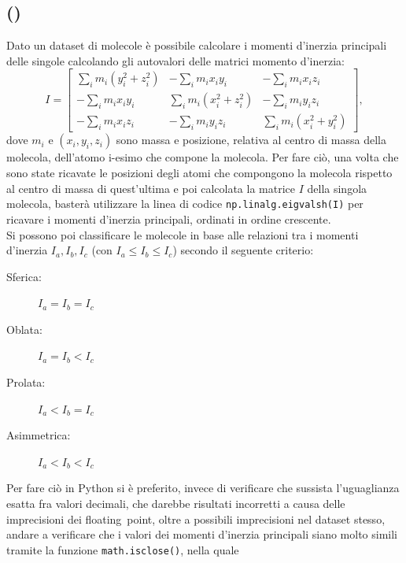 \documentclass[a4paper]{article}
\newcounter{count_es}
\newcounter{count_sub_es}[count_es]
\begin{document}
\subsection*{ ()}
Dato un dataset di molecole è possibile calcolare i momenti d'inerzia
principali delle singole calcolando gli autovalori delle matrici momento d'inerzia:
\[ I = \begin{bmatrix}
            \displaystyle\sum_{i}^{} m_{i}(y_{i}^{2} + z_{i}^{2}) & -\displaystyle\sum_{i}^{} m_{i} x_{i} y_{i}  & -\displaystyle\sum_{i}^{} m_{i} x_{i} z_{i}\\
            -\displaystyle\sum_{i}^{} m_{i} x_{i} y_{i} & \displaystyle\sum_{i}^{} m_{i}(x_{i}^{2} + z_{i}^{2}) & -\displaystyle\sum_{i}^{} m_{i} y_{i} z_{i}\\
            -\displaystyle\sum_{i}^{} m_{i} x_{i} z_{i} & -\displaystyle\sum_{i}^{} m_{i} y_{i} z_{i} & \displaystyle\sum_{i}^{} m_{i}(x_{i}^{2} + y_{i}^{2})
        \end{bmatrix}, \]
dove \(m_{i}\) e \((x_{i}, y_{i}, z_{i})\) sono massa e posizione, relativa al centro di massa 
della molecola, dell'atomo i-esimo che compone la molecola. Per fare ciò, una volta che sono state
ricavate le posizioni degli atomi che compongono la molecola rispetto al centro di massa di quest'ultima e poi calcolata la matrice \(I\) della singola molecola,
basterà utilizzare la linea di codice \lstinline{np.linalg.eigvalsh(I)} per ricavare i momenti d'inerzia
principali, ordinati in ordine crescente. \\
Si possono poi classificare le molecole in base alle relazioni tra i momenti d'inerzia \(I_{a}, I_{b}, I_{c}\) (con \(I_{a} \leq I_{b} \leq I_{c}\)) secondo 
il seguente criterio:
\begin{description}
    \item [Sferica:] \(I_{a} = I_{b} = I_{c}\) 
    \item [Oblata:] \(I_{a} = I_{b} < I_{c}\) 
    \item [Prolata:] \(I_{a} < I_{b} = I_{c}\) 
    \item [Asimmetrica:] \(I_{a} < I_{b} < I_{c}\) 
\end{description}
Per fare ciò in Python si è preferito, invece di verificare che sussista l'uguaglianza esatta fra valori decimali, 
che darebbe risultati incorretti a causa delle imprecisioni dei floating~point, oltre a possibili imprecisioni nel dataset stesso,
andare a verificare che i valori dei momenti d'inerzia principali siano molto simili tramite la funzione \lstinline{math.isclose()}, nella quale
\end{document}
